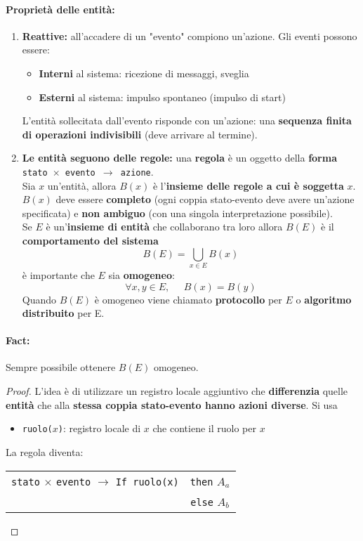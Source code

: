 \paragraph{Proprietà delle entità:}
\begin{enumerate}
	\item \textbf{Reattive:} all'accadere di un "evento" compiono un'azione. Gli eventi possono essere:
	\begin{itemize}
		\item \textbf{Interni} al sistema: ricezione di messaggi, sveglia
		\item \textbf{Esterni} al sistema: impulso spontaneo (impulso di start)
	\end{itemize}
	L'entità sollecitata dall'evento risponde con un'azione: una \textbf{sequenza finita di operazioni indivisibili} (deve arrivare al termine).\\
	
	\item \textbf{Le entità seguono delle regole:} una \textbf{regola} è un oggetto della \textbf{forma} \texttt{stato $\times$ evento $\rightarrow$ azione}.\\
	Sia $x$ un'entità, allora $B(x)$ è l'\textbf{insieme delle regole a cui è soggetta} $x$. $B(x)$ deve essere \textbf{completo} (ogni coppia stato-evento deve avere un'azione specificata) e \textbf{non ambiguo} (con una singola interpretazione possibile).\\
	
	Se $E$ è un'\textbf{insieme di entità} che collaborano tra loro allora $B(E)$ è il \textbf{comportamento del sistema}
	$$ B(E) = \bigcup_{x \in E} B(x) $$
	è importante che $E$ sia \textbf{omogeneo}:
	$$ \forall x,y \in E, \;\;\;\;\; B(x) = B(y)$$
	Quando $B(E)$ è omogeneo viene chiamato \textbf{protocollo} per $E$ o \textbf{algoritmo distribuito} per E.\\
\end{enumerate}

\paragraph{Fact:} Sempre possibile ottenere $B(E)$ omogeneo.\\

\begin{proof}
	L'idea è di utilizzare un registro locale aggiuntivo che \textbf{differenzia} quelle \textbf{entità} che alla \textbf{stessa coppia stato-evento hanno azioni diverse}. Si usa
	\begin{itemize}
		\item \texttt{ruolo($x$)}: registro locale di $x$ che contiene il ruolo per $x$
	\end{itemize}
	
	La regola diventa:  \\
	\begin{tabular}{c c}
			\texttt{stato} $\times$ \texttt{evento} $\rightarrow$ \texttt{If ruolo(x)} & \texttt{then} $A_a$ \\ 
			& \texttt{else} $A_b$
	\end{tabular}
	\nn
\end{proof}

